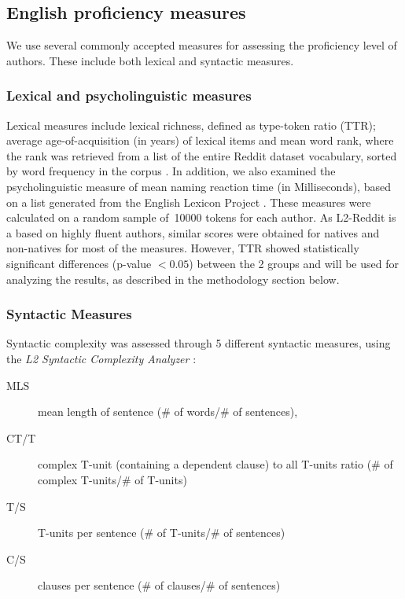 \documentclass[11pt]{article}
\begin{document}
\subsection{English proficiency measures}

We use several commonly accepted measures for assessing the proficiency level of authors. These include both lexical and syntactic measures.

\subsubsection{Lexical and psycholinguistic measures}

Lexical measures include lexical richness, defined as type-token ratio (TTR); average age-of-acquisition (in years) of lexical items \citep{Kuperman2012} and mean word rank, where the rank was retrieved from a list of the entire Reddit dataset vocabulary, sorted by word frequency in the corpus \citep{TACL1403}.  In addition, we also examined the psycholinguistic measure of mean naming reaction time (in Milliseconds), based on a list generated from the English Lexicon Project \citep{Balota2007}. These measures were calculated on a random sample of~10000 tokens for each author. As L2-Reddit is a based on highly fluent authors, similar scores were obtained for natives and non-natives for most of the measures. However, TTR showed statistically significant differences (p-value $<0.05$) between the 2 groups and will be used for analyzing the results, as described in the methodology section below.


\subsubsection{Syntactic Measures }

Syntactic complexity was assessed through 5 different syntactic measures, using the \emph{L2 Syntactic Complexity Analyzer} \citep{Lu2010-Automatic}:

\begin{description}
\item[MLS] mean length of sentence (\# of words/\# of sentences), 
\item[CT/T] complex T-unit (containing a dependent clause) to all T-units ratio (\# of complex T-units/\# of T-units)
\item[T/S] T-units per sentence (\# of T-units/\# of sentences)
\item[C/S] clauses per sentence (\# of clauses/\# of sentences)
\end{description}
\end{document}
